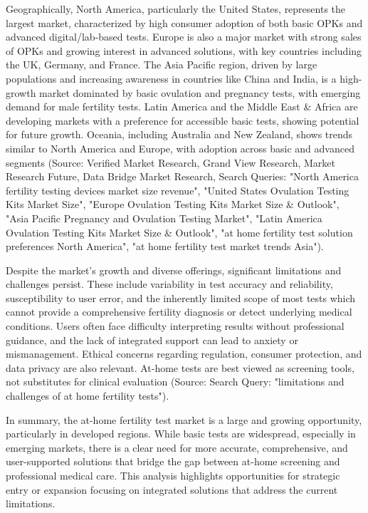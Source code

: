 \documentclass{article}
\begin{document}
Geographically, North America, particularly the United States, represents the largest market, characterized by high consumer adoption of both basic OPKs and advanced digital/lab-based tests. Europe is also a major market with strong sales of OPKs and growing interest in advanced solutions, with key countries including the UK, Germany, and France. The Asia Pacific region, driven by large populations and increasing awareness in countries like China and India, is a high-growth market dominated by basic ovulation and pregnancy tests, with emerging demand for male fertility tests. Latin America and the Middle East \& Africa are developing markets with a preference for accessible basic tests, showing potential for future growth. Oceania, including Australia and New Zealand, shows trends similar to North America and Europe, with adoption across basic and advanced segments (Source: Verified Market Research, Grand View Research, Market Research Future, Data Bridge Market Research, Search Queries: "North America fertility testing devices market size revenue", "United States Ovulation Testing Kits Market Size", "Europe Ovulation Testing Kits Market Size & Outlook", "Asia Pacific Pregnancy and Ovulation Testing Market", "Latin America Ovulation Testing Kits Market Size & Outlook", "at home fertility test solution preferences North America", "at home fertility test market trends Asia").

Despite the market's growth and diverse offerings, significant limitations and challenges persist. These include variability in test accuracy and reliability, susceptibility to user error, and the inherently limited scope of most tests which cannot provide a comprehensive fertility diagnosis or detect underlying medical conditions. Users often face difficulty interpreting results without professional guidance, and the lack of integrated support can lead to anxiety or mismanagement. Ethical concerns regarding regulation, consumer protection, and data privacy are also relevant. At-home tests are best viewed as screening tools, not substitutes for clinical evaluation (Source: Search Query: "limitations and challenges of at home fertility tests").

In summary, the at-home fertility test market is a large and growing opportunity, particularly in developed regions. While basic tests are widespread, especially in emerging markets, there is a clear need for more accurate, comprehensive, and user-supported solutions that bridge the gap between at-home screening and professional medical care. This analysis highlights opportunities for strategic entry or expansion focusing on integrated solutions that address the current limitations.
\end{document}

